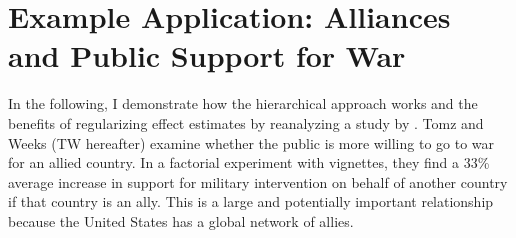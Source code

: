 \documentclass[12pt]{article}
\begin{document}

\section{Example Application: Alliances and Public Support for War} 


In the following, I demonstrate how the hierarchical approach works and the benefits of regularizing effect estimates by reanalyzing a study by \citet{TomzWeeks2021}. 
Tomz and Weeks (TW hereafter) examine whether the public is more willing to go to war for an allied country.
In a factorial experiment with vignettes, they find a 33\% average increase in support for military intervention on behalf of another country if that country is an ally. 
This is a large and potentially important relationship because the United States has a global network of allies. 
\end{document}
